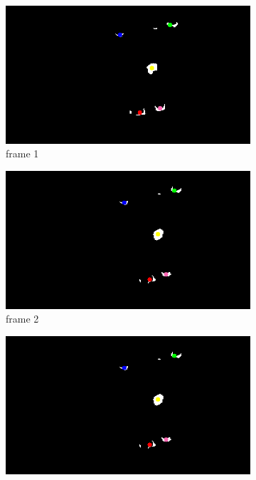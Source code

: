 \documentclass[12pt,a4paper]{article}
\begin{document}
        \begin{figure}[H]
          \centering
          \begin{subfigure}[H]{0.32\textwidth}
            \includegraphics[width=\linewidth]{192}
            \caption{frame 1}
          \end{subfigure}
          \begin{subfigure}[H]{0.32\textwidth}
            \includegraphics[width=\linewidth]{193}
            \caption{frame 2}
          \end{subfigure}
          \begin{subfigure}[H]{0.32\textwidth}
            \includegraphics[width=\linewidth]{193}

\end{subfigure}
\end{figure}
\end{document}
